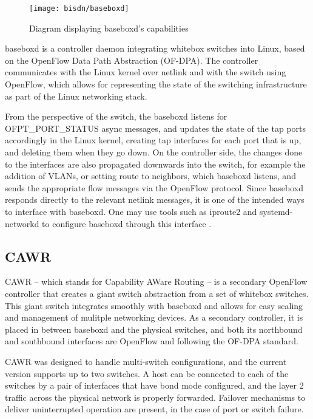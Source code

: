 \begin{figure} [!htbp]
    \centering
    \texttt{[image: bisdn/baseboxd]}
    \caption{Diagram displaying baseboxd's capabilities}
\end{figure}

baseboxd is a controller daemon integrating whitebox switches into Linux, based on the OpenFlow Data Path Abstraction (OF-DPA). The controller communicates with the Linux kernel over netlink and with the switch using OpenFlow, which allows for 
representing the state of the switching infrastructure as part of the Linux networking stack. 

\par From the perspective of the switch, the baseboxd listens for OFPT\_PORT\_STATUS async messages, and updates the state of the tap ports accordingly in the Linux kernel, creating tap interfaces for each port that is up, and deleting them when they go down. 
On the controller side, the changes done to the interfaces are also propagated downwards into the switch, for example the addition of VLANs, or setting route to neighbors, which baseboxd listens, and sends the appropriate flow messages via the OpenFlow protocol. 
Since baseboxd responds directly to the relevant netlink messages, it is one of the intended ways to interface with baseboxd. One may use tools such as iproute2 and systemd-networkd to configure baseboxd through this interface \cite{CITE - docs.bisdn.de}.


\subsection {CAWR}

CAWR – which stands for Capability AWare Routing – is a secondary OpenFlow controller that creates a giant switch abstraction from a set of whitebox switches. This giant switch integrates smoothly with baseboxd and allows for easy scaling and management of mulitple
networking devices. As a secondary controller, it is placed in between baseboxd and the physical switches, and both its northbound and southbound interfaces are OpenFlow and following the OF-DPA standard.

\par CAWR was designed to handle multi-switch configurations, and the current version supports up to two switches. A host can be connected to each of the switches by a pair of interfaces that have bond mode configured, and the layer 2 traffic across
the physical network is properly forwarded. Failover mechanisms to deliver uninterrupted operation are present, in the case of port or switch failure.

